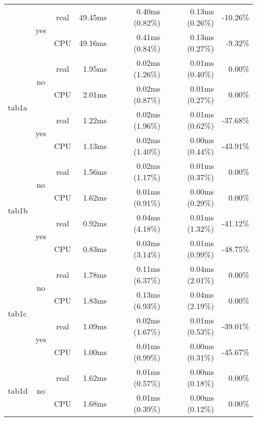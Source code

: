 \documentclass[en]{pracamgr}
\begin{document}
\begin{appendices}
\begin{small}
\begin{longtable}{|l|c|c|r|r|r|r|}
                          \cline{2-7}
                          & \multirow{2}{*}{yes} & real & 49.45ms & 0.40ms (0.82\%) & 0.13ms (0.26\%) & -10.26\% \\*
                          &                      & CPU  & 49.16ms & 0.41ms (0.84\%) & 0.13ms (0.27\%) & -9.32\% \\
\hline
\multirow{4}{*}{tab1a}    & \multirow{2}{*}{no}  & real & 1.95ms & 0.02ms (1.26\%) & 0.01ms (0.40\%) & 0.00\% \\*
                          &                      & CPU  & 2.01ms & 0.02ms (0.87\%) & 0.01ms (0.27\%) & 0.00\% \\*
                          \cline{2-7}
                          & \multirow{2}{*}{yes} & real & 1.22ms & 0.02ms (1.96\%) & 0.01ms (0.62\%) & -37.68\% \\*
                          &                      & CPU  & 1.13ms & 0.02ms (1.40\%) & 0.00ms (0.44\%) & -43.91\% \\
\hline
\multirow{4}{*}{tab1b}    & \multirow{2}{*}{no}  & real & 1.56ms & 0.02ms (1.17\%) & 0.01ms (0.37\%) & 0.00\% \\*
                          &                      & CPU  & 1.62ms & 0.01ms (0.91\%) & 0.00ms (0.29\%) & 0.00\% \\*
                          \cline{2-7}
                          & \multirow{2}{*}{yes} & real & 0.92ms & 0.04ms (4.18\%) & 0.01ms (1.32\%) & -41.12\% \\*
                          &                      & CPU  & 0.83ms & 0.03ms (3.14\%) & 0.01ms (0.99\%) & -48.75\% \\
\hline
\multirow{4}{*}{tab1c}    & \multirow{2}{*}{no}  & real & 1.78ms & 0.11ms (6.37\%) & 0.04ms (2.01\%) & 0.00\% \\*
                          &                      & CPU  & 1.83ms & 0.13ms (6.93\%) & 0.04ms (2.19\%) & 0.00\% \\*
                          \cline{2-7}
                          & \multirow{2}{*}{yes} & real & 1.09ms & 0.02ms (1.67\%) & 0.01ms (0.53\%) & -39.01\% \\*
                          &                      & CPU  & 1.00ms & 0.01ms (0.99\%) & 0.00ms (0.31\%) & -45.67\% \\
\hline
\multirow{4}{*}{tab1d}    & \multirow{2}{*}{no}  & real & 1.62ms & 0.01ms (0.57\%) & 0.00ms (0.18\%) & 0.00\% \\*
                          &                      & CPU  & 1.68ms & 0.01ms (0.39\%) & 0.00ms (0.12\%) & 0.00\% \\*

\end{longtable}
\end{small}
\end{appendices}
\end{document}
